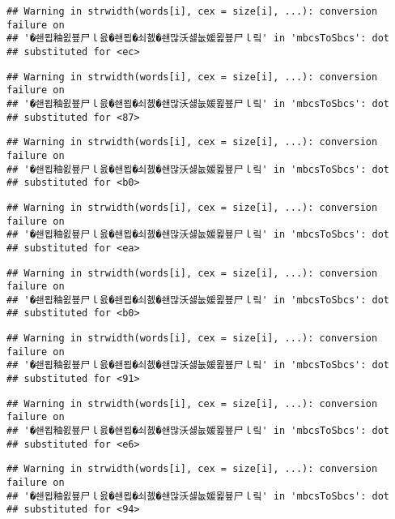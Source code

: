 \documentclass[]{article}
\begin{document}
\begin{verbatim}
## Warning in strwidth(words[i], cex = size[i], ...): conversion failure on
## '�쇈묍釉욄뵾尸ｌ읈�쇈묍�쇠쳸�쇈많沃섏눖媛묉뵾尸ｌ맄' in 'mbcsToSbcs': dot
## substituted for <ec>
\end{verbatim}

\begin{verbatim}
## Warning in strwidth(words[i], cex = size[i], ...): conversion failure on
## '�쇈묍釉욄뵾尸ｌ읈�쇈묍�쇠쳸�쇈많沃섏눖媛묉뵾尸ｌ맄' in 'mbcsToSbcs': dot
## substituted for <87>
\end{verbatim}

\begin{verbatim}
## Warning in strwidth(words[i], cex = size[i], ...): conversion failure on
## '�쇈묍釉욄뵾尸ｌ읈�쇈묍�쇠쳸�쇈많沃섏눖媛묉뵾尸ｌ맄' in 'mbcsToSbcs': dot
## substituted for <b0>
\end{verbatim}

\begin{verbatim}
## Warning in strwidth(words[i], cex = size[i], ...): conversion failure on
## '�쇈묍釉욄뵾尸ｌ읈�쇈묍�쇠쳸�쇈많沃섏눖媛묉뵾尸ｌ맄' in 'mbcsToSbcs': dot
## substituted for <ea>
\end{verbatim}

\begin{verbatim}
## Warning in strwidth(words[i], cex = size[i], ...): conversion failure on
## '�쇈묍釉욄뵾尸ｌ읈�쇈묍�쇠쳸�쇈많沃섏눖媛묉뵾尸ｌ맄' in 'mbcsToSbcs': dot
## substituted for <b0>
\end{verbatim}

\begin{verbatim}
## Warning in strwidth(words[i], cex = size[i], ...): conversion failure on
## '�쇈묍釉욄뵾尸ｌ읈�쇈묍�쇠쳸�쇈많沃섏눖媛묉뵾尸ｌ맄' in 'mbcsToSbcs': dot
## substituted for <91>
\end{verbatim}

\begin{verbatim}
## Warning in strwidth(words[i], cex = size[i], ...): conversion failure on
## '�쇈묍釉욄뵾尸ｌ읈�쇈묍�쇠쳸�쇈많沃섏눖媛묉뵾尸ｌ맄' in 'mbcsToSbcs': dot
## substituted for <e6>
\end{verbatim}

\begin{verbatim}
## Warning in strwidth(words[i], cex = size[i], ...): conversion failure on
## '�쇈묍釉욄뵾尸ｌ읈�쇈묍�쇠쳸�쇈많沃섏눖媛묉뵾尸ｌ맄' in 'mbcsToSbcs': dot
## substituted for <94>
\end{verbatim}
\end{document}
